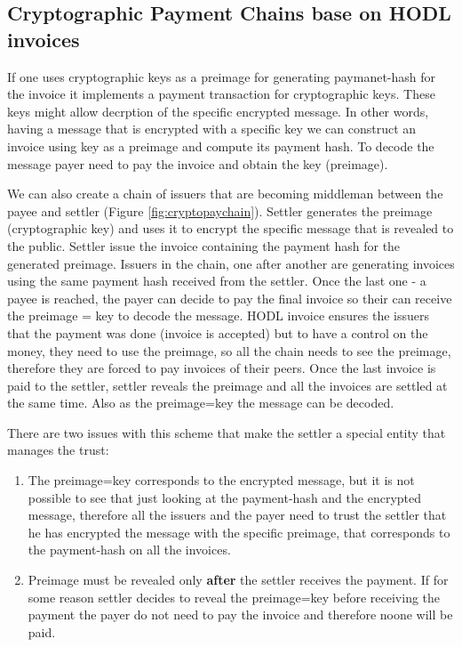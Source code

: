 \documentclass{article}
\begin{document}
\subsection{Cryptographic Payment Chains base on HODL invoices}
If one uses cryptographic keys as a preimage for generating paymanet-hash for the invoice it implements a payment transaction for cryptographic keys. These keys might allow decrption of the specific encrypted message. In other words, having a message that is encrypted with a specific key we can construct an invoice using key as a preimage and compute its payment hash. To decode the message payer need to pay the invoice and obtain the key (preimage).

We can also create a chain of issuers that are becoming middleman between the payee and settler (Figure \ref{fig:cryptopaychain}). Settler generates the preimage (cryptographic key) and uses it to encrypt the specific message that is revealed to the public. Settler issue the invoice containing the payment hash for the generated preimage. Issuers in the chain, one after another are generating invoices using the same payment hash received from the settler. Once the last one - a payee is reached, the payer can decide to pay the final invoice so their can receive the preimage = key to decode the message. HODL invoice ensures the issuers that the payment was done (invoice is accepted) but to have a control on the money, they need to use the preimage, so all the chain needs to see the preimage, therefore they are forced to pay invoices of their peers. Once the last invoice is paid to the settler, settler reveals the preimage and all the invoices are settled at the same time. Also as the preimage=key the message can be decoded.

There are two issues with this scheme that make the settler a special entity that manages the trust:
\begin{enumerate}
	\item The preimage=key corresponds to the encrypted message, but it is not possible to see that just looking at the payment-hash and the encrypted message, therefore all the issuers and the payer need to trust the settler that he has encrypted the message with the specific preimage, that corresponds to the payment-hash on all the invoices.
	\item Preimage must be revealed only \textbf{after} the settler receives the payment. If for some reason settler decides to reveal the preimage=key before receiving the payment the payer do not need to pay the invoice and therefore noone will be paid.
\end{enumerate}
\end{document}
